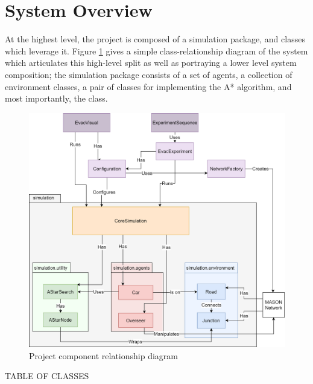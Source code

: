 \section{System Overview}

At the highest level, the project is composed of a simulation package, and classes which leverage it. Figure \ref{fig:system_overview} gives a simple class-relationship diagram of the system which articulates this high-level split as well as portraying a lower level system composition; the simulation package consists of a set of agents, a collection of environment classes, a pair of classes for implementing the A* algorithm, and most importantly, the  class.

\begin{figure}
    \centering
    \includegraphics[width=0.95\linewidth]{images/system_overview.png}
    \caption{Project component relationship diagram}
    \label{fig:system_overview}
\end{figure}

TABLE OF CLASSES